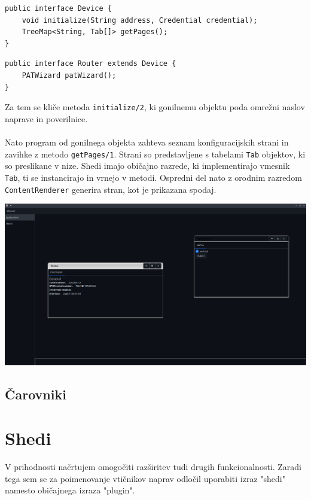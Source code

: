 \documentclass[12pt]{article}
\begin{document}
\begin{lstlisting}
public interface Device {
	void initialize(String address, Credential credential);
	TreeMap<String, Tab[]> getPages();
}
\end{lstlisting}

\begin{lstlisting}
public interface Router extends Device {
	PATWizard patWizard();
}
\end{lstlisting}
Za tem se kliče metoda \texttt{initialize/2}, ki gonilnemu objektu poda
omrežni naslov naprave in poverilnice.
\\\\
Nato program od gonilnega objekta zahteva seznam konfiguracijskih strani
in zavihke z metodo \texttt{getPages/1}. Strani so predstavljene s tabelami
\texttt{Tab} objektov, ki so preslikane v nize. Shedi imajo običajno razrede,
ki implementirajo vmesnik \texttt{Tab}, ti se instancirajo in vrnejo v
metodi. Ospredni del nato z orodnim razredom \texttt{ContentRenderer}
generira stran, kot je prikazana spodaj.

\begin{center}
	\includegraphics[scale=0.28]{slike/config-window.png}
\end{center}
\newpage

\subsection{Čarovniki}

\newpage

\section{Shedi}
V prihodnosti načrtujem omogočiti razširitev tudi drugih funkcionalnosti.
Zaradi tega sem se za poimenovanje vtičnikov naprav odločil uporabiti
izraz "shedi" namesto običajnega izraza "plugin".
\end{document}
